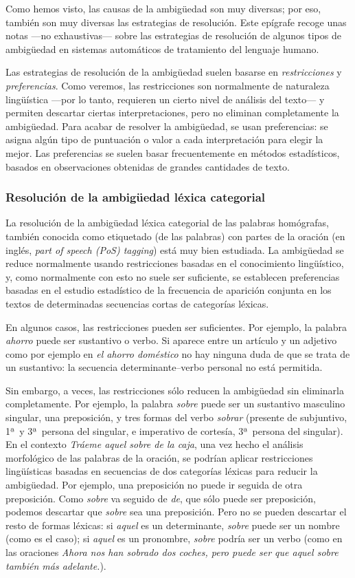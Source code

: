 Como hemos visto, las causas de la ambigüedad son muy diversas; por eso, también son muy diversas las estrategias de resolución. Este epígrafe recoge unas notas ---no exhaustivas--- sobre las estrategias de resolución de algunos tipos de ambigüedad en sistemas automáticos de tratamiento del lenguaje humano. 

Las estrategias de resolución de la ambigüedad suelen basarse en \emph{restricciones} y \emph{preferencias}. Como veremos, las restricciones son normalmente de naturaleza lingüística ---por lo tanto, requieren un cierto nivel de análisis del texto--- y permiten descartar ciertas interpretaciones, pero no eliminan completamente la ambigüedad. Para acabar de resolver la ambigüedad, se usan preferencias: se asigna algún tipo de puntuación o valor a cada interpretación para elegir la mejor. Las preferencias se suelen basar frecuentemente en métodos estadísticos, basados en observaciones obtenidas de grandes cantidades de texto. 

\subsubsection{Resolución de la ambigüedad léxica categorial} \label{s3:reshom} La resolución de la ambigüedad léxica categorial de las palabras homógrafas, también conocida como etiquetado (de las palabras) con partes de la oración (en inglés, \emph{part of speech (PoS) tagging}) está muy bien estudiada. La ambigüedad se reduce normalmente usando restricciones basadas en el conocimiento lingüístico, y, como normalmente con esto no suele ser suficiente, se establecen preferencias basadas en el estudio estadístico de la frecuencia de aparición conjunta en los textos de determinadas secuencias cortas de categorías léxicas. 

En algunos casos, las restricciones pueden ser suficientes. Por ejemplo, la palabra \emph{ahorro} puede ser sustantivo o verbo. Si aparece entre un artículo y un adjetivo como por ejemplo en \emph{el ahorro doméstico} no hay ninguna duda de que se trata de un sustantivo: la secuencia determinante--verbo personal no está permitida. 

Sin embargo, a veces, las restricciones sólo reducen la ambigüedad sin eliminarla completamente. Por ejemplo, la palabra \emph{sobre} puede ser un sustantivo masculino singular, una preposición, y tres formas del verbo \emph{sobrar} (presente de subjuntivo, 1ª\ y 3ª\ persona del singular, e imperativo de cortesía, 3ª\ persona del singular). En el contexto \emph{Tráeme aquel sobre de la caja}, una vez hecho el análisis morfológico de las palabras de la oración, se podrían aplicar restricciones lingüísticas basadas en secuencias de dos categorías léxicas para reducir la ambigüedad. Por ejemplo, una preposición no puede ir seguida de otra preposición. Como \emph{sobre} va seguido de \emph{de}, que sólo puede ser preposición, podemos descartar que \emph{sobre} sea una preposición. Pero no se pueden descartar el resto de formas léxicas: si \emph{aquel} es un determinante, \emph{sobre} puede ser un nombre (como es el caso); si \emph{aquel} es un pronombre, \emph{sobre} podría ser un verbo (como en las oraciones \emph{Ahora nos han sobrado dos coches, pero puede ser que aquel sobre también más adelante.}). 

